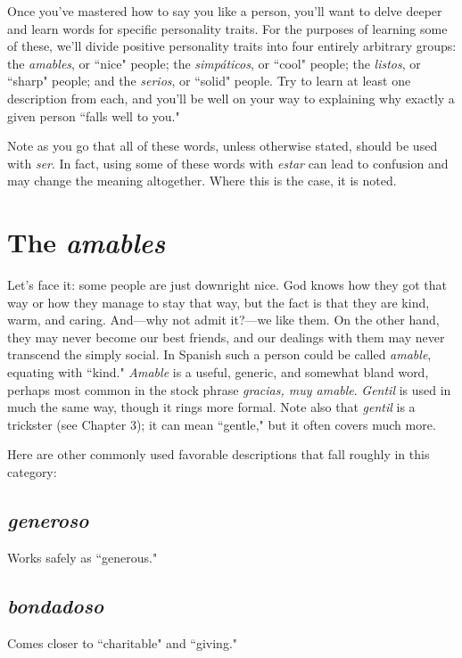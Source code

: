 Once you've mastered how to say you like a person, you'll
want to delve deeper and learn words for specific personality traits. For
the purposes of learning some of these, we'll divide positive personality traits into four entirely arbitrary groups: the \emph{amables}, or ``nice"
people; the \emph{simpáticos}, or ``cool" people; the \emph{listos}, or ``sharp" people;
and the \emph{serios}, or ``solid" people. Try to learn at least one description
from each, and you'll be well on your way to explaining why exactly a
given person ``falls well to you."

Note as you go that all of these words, unless otherwise stated,
should be used with \emph{ser}. In fact, using some of these words with \emph{estar}
can lead to confusion and may change the meaning altogether. Where
this is the case, it is noted.

\section{The \emph{amables}}

Let's face it: some people are just downright nice. God knows
how they got that way or how they manage to stay that way, but the
fact is that they are kind, warm, and caring. And---why not admit
it?---we like them. On the other hand, they may never become our best
friends, and our dealings with them may never transcend the simply
social. In Spanish such a person could be called \emph{amable}, equating with
``kind." \emph{Amable} is a useful, generic, and somewhat bland word, perhaps most common in the stock phrase \emph{gracias, muy amable}. \emph{Gentil}
is used in much the same way, though it rings more formal. Note also
that \emph{gentil} is a trickster (see Chapter 3); it can mean ``gentle," but it often covers much more.

Here are other commonly used favorable descriptions that fall
roughly in this category:

\subsection{\emph{generoso}}

Works safely as ``generous."

\subsection{\emph{bondadoso}}

Comes closer to ``charitable" and ``giving."

